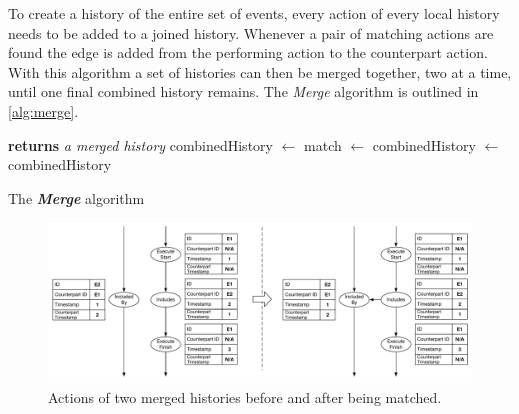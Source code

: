 	\newpar To create a history of the entire set of events, every action of every local history needs to be added to a joined history. Whenever a pair of matching actions are found the edge is added from the performing action to the counterpart action. With this algorithm a set of histories can then be merged together, two at a time, until one final combined history remains. The \textit{Merge} algorithm is outlined in \autoref{alg:merge}.
	
	\begin{algorithm}
		\begin{algorithmic}
			 \textbf{returns} \textit{a merged history}
			\State combinedHistory $\leftarrow$ 
			\State match $\leftarrow$ 
			\State combinedHistory $\leftarrow$ 
			\EndIf
			\EndIf
			\EndFor
			\State\Return combinedHistory
			\EndFunction
		\end{algorithmic}
		\caption{The \textit{\textbf{Merge}} algorithm}
		\label{alg:merge}
	\end{algorithm}
	
	\begin{figure}[H]
		\centering
		\includegraphics[width=\textwidth]{4connect/images/match-before-after.pdf}
		\caption{Actions of two merged histories before and after being matched.}
		\label{fig:connecting:match-before-after}
	\end{figure}
	
    
